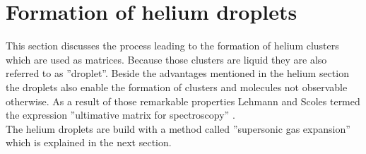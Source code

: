 \documentclass[parskip,12pt,headsepline,a4paper] {scrbook}
\begin{document}
\section{Formation of helium droplets}
\vspace{-1\baselineskip}
This section discusses the process leading to the formation of helium clusters which are used as matrices. Because those clusters are liquid they are also referred to as ''droplet''. Beside the advantages mentioned in the helium section the droplets also enable the formation of clusters and molecules not observable otherwise. As a result of those remarkable properties Lehmann and Scoles termed the expression ''ultimative matrix for spectroscopy'' \cite{ultimate}. \\
The helium droplets are build with a method called ''supersonic gas expansion'' which is explained in the next section.

\end{document}
